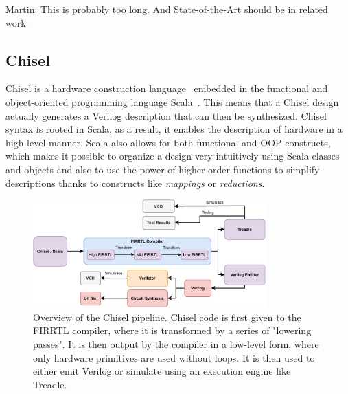 \documentclass[conference]{IEEEtran}
\newcommand{\martin}[1]{{\color{blue} Martin: #1}}
\begin{document}
\martin{This is probably too long. And State-of-the-Art should be in related work.}

\subsection{Chisel}
Chisel is a hardware construction language~\cite{chisel:dac2012, chisel:book} embedded in the functional and object-oriented programming language Scala~\cite{Scala}. 
This means that a Chisel design actually generates a Verilog description that can then be synthesized. 
Chisel syntax is rooted in Scala, as a result, it enables the description of hardware in a high-level manner. 
Scala also allows for both functional and OOP constructs, which makes it possible to organize a design very intuitively using Scala classes and objects and also to use the power of higher order functions to simplify descriptions thanks to constructs like \textit{mappings} or \textit{reductions}.

\begin{figure}[t]
    \centering
    \includegraphics[width=0.8\textwidth]{Chisel_FIRRTL_VERILOG.pdf}
    \caption{Overview of the Chisel pipeline. Chisel code is first given to the FIRRTL compiler, where it is transformed by a series of "lowering passes". It is then output by the compiler in a low-level form, where only hardware primitives are used without loops. It is then used to either emit Verilog or simulate using an execution engine like Treadle.}
\label{fig:chisel}
\end{figure}
\end{document}
